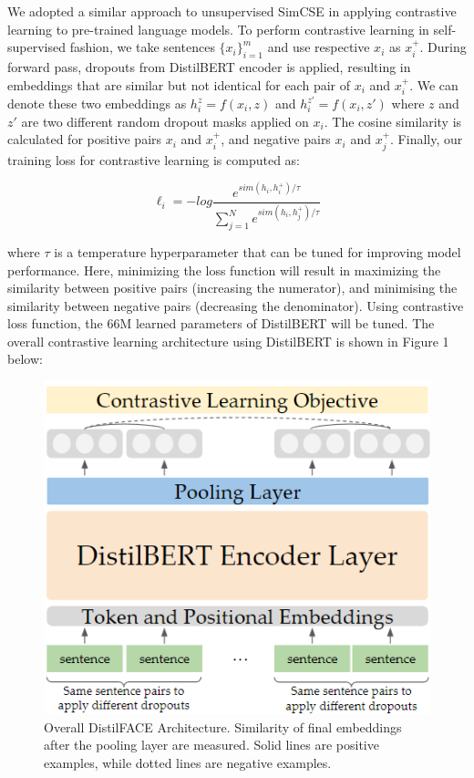 \documentclass[10pt,twocolumn,letterpaper]{article}
\begin{document}
We adopted a similar approach to unsupervised SimCSE \cite{2104.08821} in applying contrastive learning to pre-trained language models. To perform contrastive learning in self-supervised fashion, we take sentences \(\{x_i\}^m_{i=1}\) and use respective \(x_i\) as \(x_i^+\). During forward pass, dropouts from DistilBERT encoder is applied, resulting in embeddings that are similar but not identical for each pair of \(x_i\) and \(x_i^+\). We can denote these two embeddings as \(h_i^{z} = f(x_i, z)\) and \(h_i^{z'} = f(x_i, z')\) where \(z\) and \(z'\) are two different random dropout masks applied on \(x_i\). The cosine similarity is calculated for positive pairs \(x_i\) and \(x_i^+\), and negative pairs \(x_i\) and \(x_j^+\). Finally, our training loss for contrastive learning is computed as:

\[ \ell_i = -log \frac{e^{sim(h_i, h_i^+)/\tau}}{\sum_{j=1}^N e^{sim(h_i, h_j^+)/\tau}} \]

where \( \tau \) is a temperature hyperparameter that can be tuned for improving model performance. Here, minimizing the loss function will result in maximizing the similarity between positive pairs (increasing the numerator), and minimising the similarity between negative pairs (decreasing the denominator). Using contrastive loss function, the 66M learned parameters of DistilBERT will be tuned. The overall contrastive learning architecture using DistilBERT is shown in Figure 1 below:

\begin{figure}[hbt!]
\centering
\includegraphics[scale=0.65]{images/DistilFACE-Architecture.png}
\caption{Overall DistilFACE Architecture. Similarity of final embeddings after the pooling layer are measured. Solid lines are positive examples, while dotted lines are negative examples.}
\label{fig:short}
\end{figure}
\end{document}
